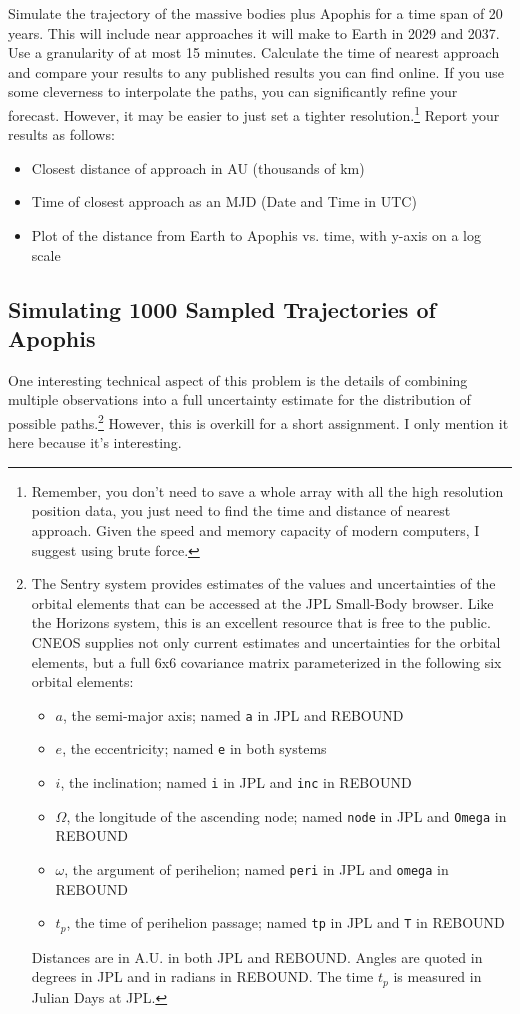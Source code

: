 \documentclass{article}
\newcommand{\tty}[1]{\texttt{#1}}
\begin{document}
Simulate the trajectory of the massive bodies plus Apophis for a time span of 20 years.
This will include near approaches it will make to Earth in 2029 and 2037.
Use a granularity of at most 15 minutes.
Calculate the time of nearest approach and compare your results to any published results you can find online.
If you use some cleverness to interpolate the paths, you can significantly refine your forecast.
However, it may be easier to just set a tighter resolution.\footnote{
Remember, you don't need to save a whole array with all the high resolution position data, 
you just need to find the time and distance of nearest approach.
Given the speed and memory capacity of modern computers, I suggest using brute force.}
Report your results as follows:
\begin{itemize}
\item Closest distance of approach in AU (thousands of km)
\item Time of closest approach as an MJD (Date and Time in UTC)
\item Plot of the distance from Earth to Apophis vs. time, with y-axis on a log scale
\end{itemize}

\subsection*{Simulating 1000 Sampled Trajectories of Apophis}
One interesting technical aspect of this problem is the details of combining multiple 
observations into a full uncertainty estimate for the distribution of possible paths.\footnote{
The Sentry system provides estimates of the values and uncertainties of the
orbital elements that can be accessed at the JPL Small-Body browser.
Like the Horizons system, this is an excellent resource that is free to the public.
CNEOS supplies not only current estimates and uncertainties for 
the orbital elements, but a full 6x6 covariance matrix parameterized in the following six 
orbital elements:
\begin{itemize}
\item $a$, the semi-major axis; named \tty{a} in JPL and REBOUND
\item $e$, the eccentricity; named \tty{e} in both systems
\item $i$, the inclination; named \tty{i} in JPL and \tty{inc} in REBOUND
\item $\Omega$, the longitude of the ascending node; named \tty{node} in JPL and \tty{Omega} in REBOUND
\item $\omega$, the argument of perihelion; named \tty{peri} in JPL and \tty{omega} in REBOUND
\item $t_p$, the time of perihelion passage; named \tty{tp} in JPL and \tty{T} in REBOUND
\end{itemize}
Distances are in A.U. in both JPL and REBOUND.  
Angles are quoted in degrees in JPL and in radians in REBOUND.
The time $t_p$ is measured in Julian Days at JPL.
}
However, this is overkill for a short assignment.
I only mention it here because it's interesting.
\end{document}
